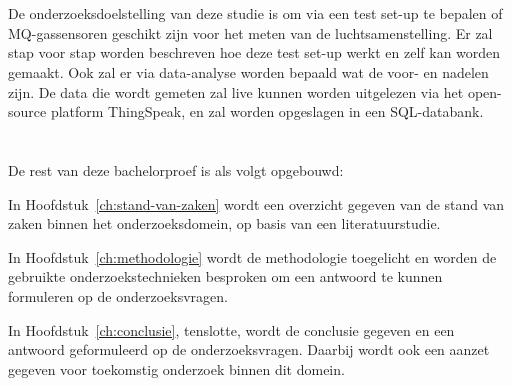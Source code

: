 \section{}%
\label{sec:onderzoeksdoelstelling}


De onderzoeksdoelstelling van deze studie is om via een test set-up te bepalen of MQ-gassensoren geschikt zijn voor het meten van de luchtsamenstelling. Er zal stap voor stap worden beschreven hoe deze test set-up werkt en zelf kan worden gemaakt. Ook zal er via data-analyse worden bepaald wat de voor- en nadelen zijn. De data die wordt gemeten zal live kunnen worden uitgelezen via het open-source platform ThingSpeak, en zal worden opgeslagen in een SQL-databank.



\section{}%
\label{sec:opzet-bachelorproef}


De rest van deze bachelorproef is als volgt opgebouwd:

In Hoofdstuk~\ref{ch:stand-van-zaken} wordt een overzicht gegeven van de stand van zaken binnen het onderzoeksdomein, op basis van een literatuurstudie.

In Hoofdstuk~\ref{ch:methodologie} wordt de methodologie toegelicht en worden de gebruikte onderzoekstechnieken besproken om een antwoord te kunnen formuleren op de onderzoeksvragen.



In Hoofdstuk~\ref{ch:conclusie}, tenslotte, wordt de conclusie gegeven en een antwoord geformuleerd op de onderzoeksvragen. Daarbij wordt ook een aanzet gegeven voor toekomstig onderzoek binnen dit domein.